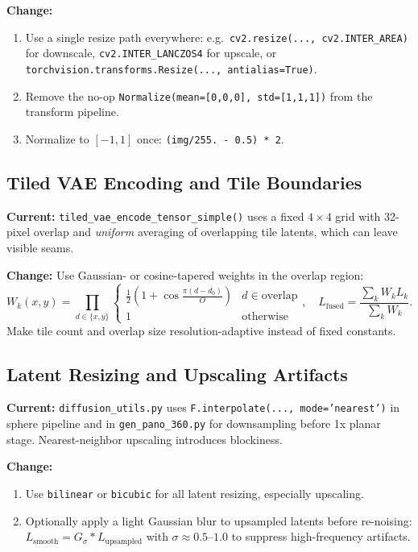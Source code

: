 \documentclass[11pt,a4paper]{article}
\newcommand{\file}[1]{\texttt{#1}}
\newcommand{\fn}[1]{\texttt{#1}}
\begin{document}
\textbf{Change:}
\begin{enumerate}
    \item Use a single resize path everywhere: e.g.\ \fn{cv2.resize(..., cv2.INTER\_AREA)} for downscale, \fn{cv2.INTER\_LANCZOS4} for upscale, or \fn{torchvision.transforms.Resize(..., antialias=True)}.
    \item Remove the no-op \fn{Normalize(mean=[0,0,0], std=[1,1,1])} from the transform pipeline.
    \item Normalize to $[-1,1]$ once: \fn{(img/255. - 0.5) * 2}.
\end{enumerate}

\subsection{Tiled VAE Encoding and Tile Boundaries}

\textbf{Current:} \fn{tiled\_vae\_encode\_tensor\_simple()} uses a fixed $4\times 4$ grid with 32-pixel overlap and \emph{uniform} averaging of overlapping tile latents, which can leave visible seams.

\textbf{Change:} Use Gaussian- or cosine-tapered weights in the overlap region:
\begin{equation}
W_k(x,y) = \prod_{d\in\{x,y\}} \begin{cases}
\frac{1}{2}\left(1 + \cos\frac{\pi(d-d_0)}{O}\right) & d \in \text{overlap} \\
1 & \text{otherwise}
\end{cases}, \quad
L_{\text{fused}} = \frac{\sum_k W_k L_k}{\sum_k W_k}.
\end{equation}
Make tile count and overlap size resolution-adaptive instead of fixed constants.

\subsection{Latent Resizing and Upscaling Artifacts}

\textbf{Current:} \file{diffusion\_utils.py} uses \fn{F.interpolate(..., mode='nearest')} in sphere pipeline and in \file{gen\_pano\_360.py} for downsampling before 1x planar stage. Nearest-neighbor upscaling introduces blockiness.

\textbf{Change:}
\begin{enumerate}
    \item Use \texttt{bilinear} or \texttt{bicubic} for all latent resizing, especially upscaling.
    \item Optionally apply a light Gaussian blur to upsampled latents before re-noising: $L_{\text{smooth}} = G_\sigma * L_{\text{upsampled}}$ with $\sigma \approx 0.5$--$1.0$ to suppress high-frequency artifacts.
\end{enumerate}
\end{document}
